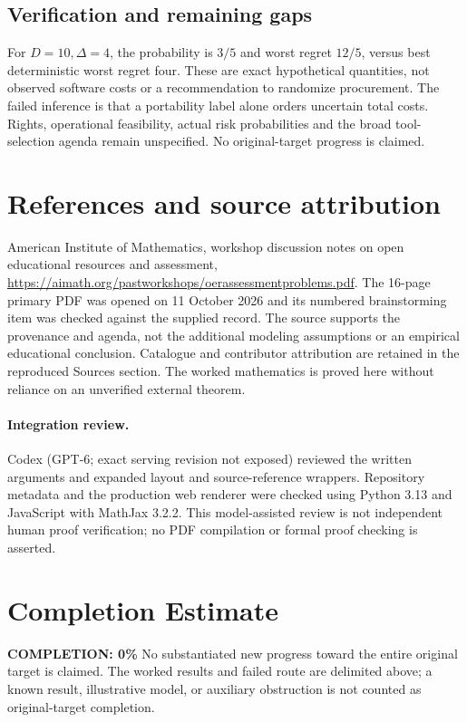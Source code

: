 \documentclass[11pt]{article}
\begin{document}
\subsection{Verification and remaining gaps}
For $D=10,\Delta=4$, the probability is $3/5$ and worst regret $12/5$, versus best deterministic worst regret four. These are exact hypothetical quantities, not observed software costs or a recommendation to randomize procurement. The failed inference is that a portability label alone orders uncertain total costs. Rights, operational feasibility, actual risk probabilities and the broad tool-selection agenda remain unspecified. No original-target progress is claimed.

\section{References and source attribution}
American Institute of Mathematics, workshop discussion notes on open educational resources and assessment, \url{https://aimath.org/pastworkshops/oerassessmentproblems.pdf}. The 16-page primary PDF was opened on 11 October 2026 and its numbered brainstorming item was checked against the supplied record. The source supports the provenance and agenda, not the additional modeling assumptions or an empirical educational conclusion. Catalogue and contributor attribution are retained in the reproduced Sources section. The worked mathematics is proved here without reliance on an unverified external theorem.


\paragraph{Integration review.} Codex (GPT-6; exact serving revision not exposed) reviewed the written arguments and expanded layout and source-reference wrappers. Repository metadata and the production web renderer were checked using Python 3.13 and JavaScript with MathJax 3.2.2. This model-assisted review is not independent human proof verification; no PDF compilation or formal proof checking is asserted.

\section{Completion Estimate}
\noindent\textbf{COMPLETION: 0\%}
No substantiated new progress toward the entire original target is claimed. The worked results and failed route are delimited above; a known result, illustrative model, or auxiliary obstruction is not counted as original-target completion.
\end{document}
